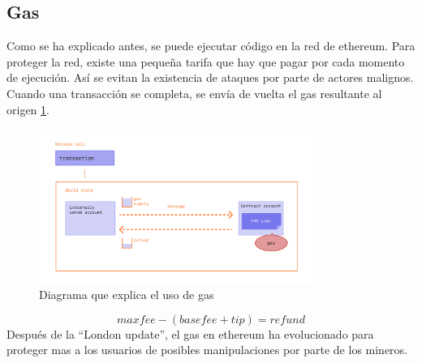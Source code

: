 \subsection{Gas}
Como se ha explicado antes, se puede ejecutar código en la red de ethereum. Para proteger la red, existe una pequeña tarifa que hay que pagar por cada momento de ejecución. Así se evitan la existencia de ataques por parte de actores malignos.
Cuando una transacción se completa, se envía de vuelta el gas resultante al origen \ref{fg:message_diagram}.
\begin{figure}[h!]
    \centering
    \includegraphics[width=0.8\textwidth]{Figures/gas-tx.png}
    \caption{Diagrama que explica el uso de gas}
    \label{fg:message_diagram}
\end{figure}
\begin{equation}
    max fee - (base fee + tip) = refund
\end{equation}
Después de la “London update”, el gas en ethereum ha evolucionado para proteger mas a los usuarios de posibles manipulaciones por parte de los mineros.
